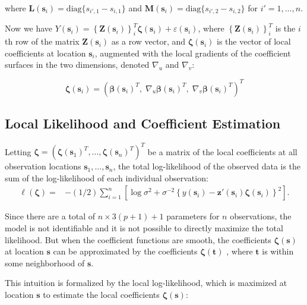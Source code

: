 \documentclass[12pt,english,authoryear, review]{article}\usepackage[]{graphicx}\usepackage[]{color}
\theoremstyle{plain}
\theoremstyle{plain}
\begin{document}
where $\bm{L}\left(\bm{s}_{i}\right)=\text{diag}\{s_{i',1}-s_{i,1}\}$
and $\bm{M}\left(\bm{s}_{i}\right)=\text{diag}\{s_{i',2}-s_{i,2}\}$
for $i'=1,\dots,n$.

Now we have $Y(\bm{s}_{i})=\left\{ \bm{Z}(\bm{s}_{i})\right\} _{i}^{T}\bm{\zeta}(\bm{s}_{i})+\varepsilon(\bm{s}_{i})$,
where $\left\{ \bm{Z}(\bm{s}_{i})\right\} _{i}^{T}$ is the $i$th
row of the matrix $\bm{Z}(\bm{s}_{i})$ as a row vector, and $\bm{\zeta}(\bm{s}_{i})$
is the vector of local coefficients at location $\bm{s}_{i}$, augmented
with the local gradients of the coefficient surfaces in the two dimensions,
denoted $\nabla_{u}$ and $\nabla_{v}$:

\begin{equation}
\bm{\zeta}(\bm{s}_{i})=\left(\bm{\beta}(\bm{s}_{i})^{T},\;\nabla_{u}\bm{\beta}(\bm{s}_{i})^{T},\;\nabla_{v}\bm{\beta}(\bm{s}_{i})^{T}\right)^{T}\label{eq:augmented-coefficients}
\end{equation}



\subsection{Local Likelihood and Coefficient Estimation}

Letting $\bm{\zeta}=\left(\bm{\zeta}\left(\bm{s}_{1}\right)^{T},\dots,\bm{\zeta}\left(\bm{s}_{n}\right)^{T}\right)^{T}$
be a matrix of the local coefficients at all observation locations
$\bm{s}_{1},\dots,\bm{s}_{n}$, the total log-likelihood of the observed
data is the sum of the log-likelihood of each individual observation:
\begin{align}
\ell\left(\bm{\zeta}\right)= & -(1/2)\sum_{i=1}^{n}\left[\log{\sigma^{2}}+\sigma^{-2}\left\{ y(\bm{s}_{i})-\bm{z}'(\bm{s}_{i})\bm{\zeta}(\bm{s}_{i})\right\} ^{2}\right].\label{eq:coefficients}
\end{align}


Since there are a total of $n\times3(p+1)+1$ parameters for $n$
observations, the model is not identifiable and it is not possible
to directly maximize the total likelihood. But when the coefficient
functions are smooth, the coefficients $\bm{\zeta}\left(\bm{s}\right)$
at location $\bm{s}$ can be approximated by the coefficients $\bm{\zeta}\left(\bm{t}\right)$
, where $\bm{t}$ is within some neighborhood of $\bm{s}$.

This intuition is formalized by the local log-likelihood, which is
maximized at location $\bm{s}$ to estimate the local coefficients
$\bm{\zeta}(\bm{s})$:
\end{document}
